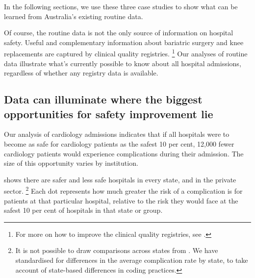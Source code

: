 \documentclass[FrontPage]{grattan}
\begin{document}
In the following sections, we use these three case studies to show what can be learned from Australia's existing routine data.

Of course, the routine data is not the only source of information on hospital safety.
Useful and complementary information about bariatric surgery and knee replacements are captured by clinical quality registries.%
	\footnote{For more on how to improve the clinical quality registries, see .}
Our analyses of routine data illustrate what's currently possible to know about all hospital admissions, regardless of whether any registry data is available.

\subsection{Data can illuminate where the biggest opportunities for safety improvement lie}\label{subsec:data-can-illuminate-where-the-biggest-opportunities-for-safety-improvement-lie}

Our analysis of cardiology admissions indicates that if all hospitals were to become as safe for cardiology patients as the safest 10 per cent, 12,000 fewer cardiology patients would experience complications during their admission.
The size of this opportunity varies by institution.

 shows there are safer and less safe hospitals in every state, and in the private sector.%
	\footnote{It is not possible to draw comparisons across states from .
	We have standardised for differences in the average complication rate by state, to take account of state-based differences in coding practices.}
Each dot represents how much greater the risk of a complication is for patients at that particular hospital, relative to the risk they would face at the safest 10 per cent of hospitals in that state or group.
\end{document}

